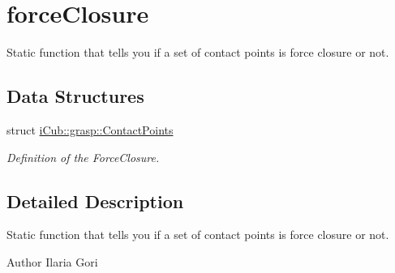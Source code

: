 \section{force\+Closure}
\label{group__forceClosure}


Static function that tells you if a set of contact points is force closure or not.  


\subsection*{Data Structures}
\begin{DoxyCompactItemize}
\item 
struct \hyperlink{structiCub_1_1grasp_1_1ContactPoints}{i\+Cub\+::grasp\+::\+Contact\+Points}
\begin{DoxyCompactList}\small\item\em Definition of the Force\+Closure. \end{DoxyCompactList}\end{DoxyCompactItemize}


\subsection{Detailed Description}
Static function that tells you if a set of contact points is force closure or not. 

\begin{DoxyAuthor}{Author}
Ilaria Gori 
\end{DoxyAuthor}
